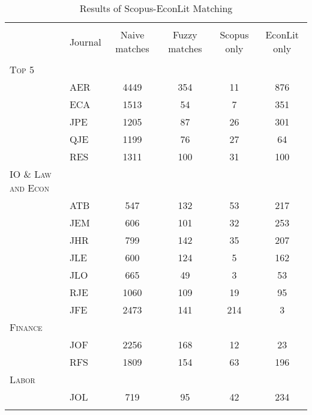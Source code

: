 
\begin{table}[h] \centering 
  \caption{Results of Scopus-EconLit Matching} 
  \label{} 
\begin{tabular}{@{\extracolsep{5pt}} llcccc} 
\\[-1.8ex]\hline 
\hline \\[-1.8ex] 
 & Journal & Naive matches & Fuzzy matches & Scopus only & EconLit only \\ 
\hline \\[-1.8ex] 
\textsc{Top 5} & & & & & \\ 
 & AER & 4449 & 354 & 11 & 876 \\ 
 & ECA & 1513 & 54 & 7 & 351 \\ 
 & JPE & 1205 & 87 & 26 & 301 \\ 
 & QJE & 1199 & 76 & 27 & 64 \\ 
 & RES & 1311 & 100 & 31 & 100 \\ 
\textsc{IO \& Law and Econ} & & & & & \\ 
 & ATB & 547 & 132 & 53 & 217 \\ 
 & JEM & 606 & 101 & 32 & 253 \\ 
 & JHR & 799 & 142 & 35 & 207 \\ 
 & JLE & 600 & 124 & 5 & 162 \\ 
 & JLO & 665 & 49 & 3 & 53 \\ 
 & RJE & 1060 & 109 & 19 & 95 \\ 
 & JFE & 2473 & 141 & 214 & 3 \\ 
\textsc{Finance} & & & & & \\ 
 & JOF & 2256 & 168 & 12 & 23 \\ 
 & RFS & 1809 & 154 & 63 & 196 \\ 
\textsc{Labor} & & & & & \\ 
 & JOL & 719 & 95 & 42 & 234 \\ 
\hline \\[-1.8ex] 
\end{tabular} 
\end{table} 
